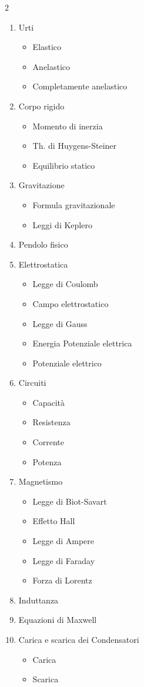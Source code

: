 \documentclass[a4paper,11pt]{article}
\newcommand{\orig}[1]{\clearpage}
\begin{document}
\begin{multicols}{2}
\begin{enumerate}
\item Urti\begin{itemize}\item Elastico\item Anelastico\item Completamente anelastico\end{itemize}
\item Corpo rigido\begin{itemize}\item Momento di inerzia\item Th. di Huygens-Steiner\item Equilibrio statico\end{itemize}
\item Gravitazione\begin{itemize}\item Formula gravitazionale\item Leggi di Keplero\end{itemize}
\item Pendolo fisico
\item Elettrostatica\begin{itemize}\item Legge di Coulomb\item Campo elettrostatico\item Legge di Gauss\item Energia Potenziale elettrica\item Potenziale elettrico\end{itemize}
\item Circuiti\begin{itemize}\item Capacità\item Resistenza\item Corrente\item Potenza\end{itemize}
\item Magnetismo\begin{itemize}\item Legge di Biot-Savart\item Effetto Hall\item Legge di Ampere\item Legge di Faraday\item Forza di Lorentz\end{itemize}
\item Induttanza
\item Equazioni di Maxwell
\item Carica e scarica dei Condensatori\begin{itemize}\item Carica\item Scarica\end{itemize}
\end{enumerate}\end{multicols}
\orig{2}
\end{document}
